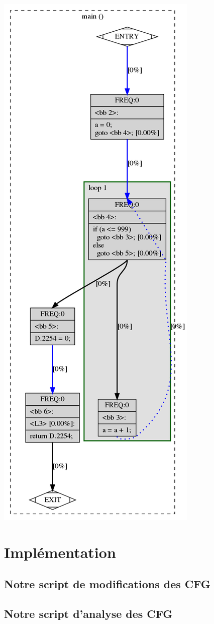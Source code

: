 \begin{multicols}{2}

\begin{center}
    \includegraphics[scale=0.32]{images/graph2.png}
\end{center}
\end{multicols}
\section{Implémentation}
\subsection{Notre script de modifications des CFG}
\subsection{Notre script d'analyse des CFG}